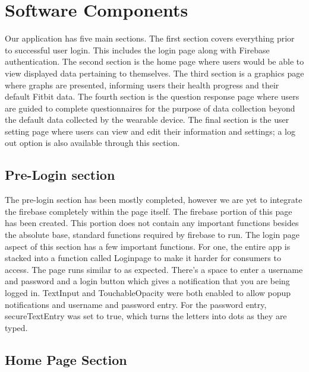 \documentclass[]{book}
\begin{document}
\hypertarget{software-components}{%
\section{Software Components}\label{software-components}}

Our application has five main sections. The first section covers everything prior to successful user login. This includes the login page along with Firebase authentication. The second section is the home page where users would be able to view displayed data pertaining to themselves. The third section is a graphics page where graphs are presented, informing users their health progress and their default Fitbit data. The fourth section is the question response page where users are guided to complete questionnaires for the purpose of data collection beyond the default data collected by the wearable device. The final section is the user setting page where users can view and edit their information and settings; a log out option is also available through this section.

\hypertarget{pre-login-section}{%
\subsection{Pre-Login section}\label{pre-login-section}}

The pre-login section has been mostly completed, however we are yet to integrate the firebase completely within the page itself. The firebase portion of this page has been created. This portion does not contain any important functions besides the absolute base, standard functions required by firebase to run. The login page aspect of this section has a few important functions. For one, the entire app is stacked into a function called Loginpage to make it harder for consumers to access. The page runs similar to as expected. There's a space to enter a username and password and a login button which gives a notification that you are being logged in. TextInput and TouchableOpacity were both enabled to allow popup notifications and username and password entry. For the password entry, secureTextEntry was set to true, which turns the letters into dots as they are typed.

\hypertarget{home-page-section}{%
\subsection{Home Page Section}\label{home-page-section}}
\end{document}
